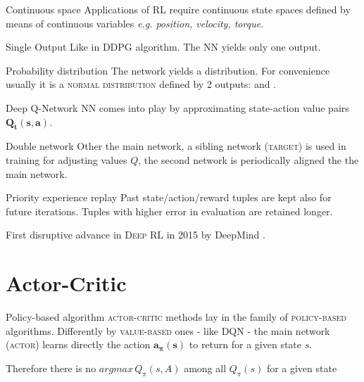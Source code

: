 \documentclass[aspectratio=169]{beamer}
\begin{document}
\begin{frame}{Continuous space}
	Applications of \textsc{RL} require continuous state spaces defined by means of continuous variables \textit{e.g. position, velocity, torque}. 
		\begin{alertblock}{Single Output}		
				Like in \textsc{DDPG} algorithm. The \textsc{NN} yields only one output.
		\end{alertblock}
		\begin{alertblock}{Probability distribution}
The network yields a distribution. For convenience usually it is a \textsc{normal distribution} defined by 2 outputs: \textbf{\textsc{\textmugreek}}  and \textbf{\textsc{\textsigma}}.		
		\end{alertblock}			
\end{frame}
\begin{frame}{Deep Q-Network}
	\textsc{NN} comes into play by approximating state-action value pairs $\mathbf{Q_t(s, a)}$.
	
	\begin{alertblock}{Double network}
	Other the main network, a sibling network (\textsc{target}) is used in training for adjusting values $Q$, the second network is periodically aligned the the main network.	 
	\end{alertblock}
	\begin{alertblock}{Priority experience replay}
	Past state/action/reward tuples are kept also for future iterations. Tuples with higher error in evaluation are retained longer. 
	\end{alertblock}
	\faBullhorn\hspace{2pt}First disruptive advance in \textsc{Deep RL} in 2015 by DeepMind
	\cite{mnih2015human}. 
\end{frame}

\section{Actor-Critic}
\begin{frame}{Policy-based algorithm}
	\textsc{actor-critic} methods lay in the family of \textsc{policy-based} algorithms.
	Differently by \textsc{value-based} ones - like \textsc{DQN} - the main network (\textsc{actor}) learns directly the action $\mathbf{a_\pi (s)}$ to return for a given state $s$.
	
	\faBullhorn\vspace{2pt} Therefore there is no $argmax\,Q_\pi(s, A)$ among all $Q_\pi(s)$ for a given state
\end{frame}
\end{document}
